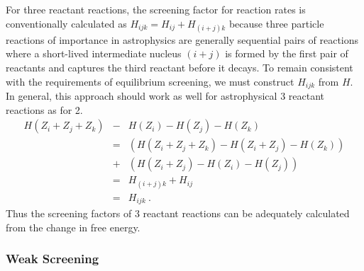 \documentclass[12pt,modern,tighten,times,apj]{aastex61}
\begin{document}
For three reactant reactions, the screening factor for reaction rates is conventionally calculated as $H_{ijk} = H_{ij} + H_{(i+j)k}$ because three particle reactions of importance in astrophysics are generally sequential pairs of reactions where a short-lived intermediate nucleus $(i+j)$ is formed by the first pair of reactants and captures the third reactant before it decays.
To remain consistent with the requirements of equilibrium screening, we must construct $H_{ijk}$ from $H$.
In general, this approach should work as well for astrophysical 3 reactant reactions as for 2.  
\begin{eqnarray}
H(Z_i+Z_j+Z_k) &-&H(Z_i) - H(Z_j) - H(Z_k) \\
&=& \left(H(Z_i+Z_j+Z_k) - H(Z_i+Z_j) - H(Z_k)\right) \\
&+& \left(H(Z_i+Z_j) - H(Z_i) - H(Z_j)\right) \\
&=& H_{(i+j)k} + H_{ij} \\
&=& H_{ijk} \ . 
\end{eqnarray}
Thus the screening factors of 3 reactant reactions can be adequately calculated from the change in free energy. 

\subsubsection{Weak Screening}
\end{document}
